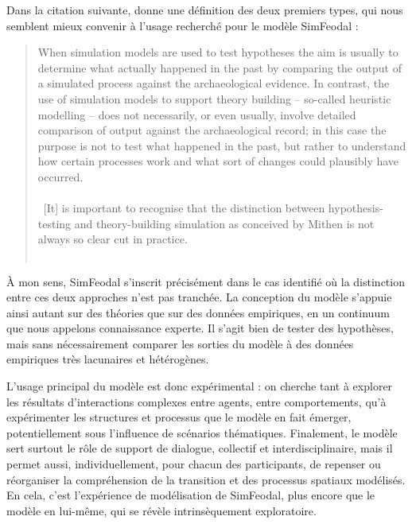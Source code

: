 Dans la citation suivante, \citeauthor{lake_trends_2014} donne une définition des deux premiers types, qui nous semblent mieux convenir à l'usage recherché pour le modèle SimFeodal :
\begin{quotation}
\noindent \og 
When simulation models are used to test hypotheses the aim is usually to determine what actually happened in the past by comparing the output of a simulated process against the archaeological evidence.
In contrast, the use of simulation models to support theory building -- so-called heuristic modelling -- does not necessarily, or even usually, involve detailed comparison of output against the archaeological record; in this case the purpose is not to test what happened in the past, but rather to understand how certain processes work and what sort of changes could plausibly have occurred.\\
\textelp{} \\
~[It] is important to recognise that the distinction between hypothesis-testing and theory-building simulation as conceived by Mithen is not always so clear cut in practice.
\fg{} \\
\citetrackerfalse
\mbox{}~ \hfill \cite[260]{lake_trends_2014}
\citetrackertrue
\end{quotation}

À mon sens, SimFeodal s'inscrit précisément dans le cas identifié où la distinction entre ces deux approches n'est pas tranchée.
La conception du modèle s'appuie ainsi autant sur des théories que sur des données empiriques, en un continuum que nous appelons \og connaissance experte\fg{}.
Il s'agit bien de tester des hypothèses, mais sans nécessairement comparer les sorties du modèle à des données empiriques très lacunaires et hétérogènes.

L'usage principal du modèle est donc expérimental : on cherche tant à explorer les résultats d'interactions complexes entre agents, entre comportements, qu'à expérimenter les structures et processus que le modèle en fait émerger, potentiellement sous l'influence de \og scénarios thématiques\fg{}.
Finalement, le modèle sert surtout le rôle de support de dialogue, collectif et interdisciplinaire, mais il permet aussi, individuellement, pour chacun des participants, de repenser ou réorganiser la compréhension de la transition et des processus spatiaux modélisés.
En cela, c'est l'expérience de modélisation de SimFeodal, plus encore que le modèle en lui-même, qui se révèle intrinsèquement exploratoire.

